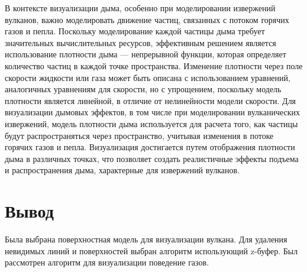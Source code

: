 В контексте визуализации дыма, особенно при моделировании извержений вулканов, важно моделировать движение частиц, связанных с потоком горячих газов и пепла. Поскольку моделирование каждой частицы дыма требует значительных вычислительных ресурсов, эффективным решением является использование плотности дыма --- непрерывной функции, которая определяет количество частиц в каждой точке пространства. Изменение плотности через поле скорости жидкости или газа может быть описана с использованием уравнений, аналогичных уравнениям для скорости, но с упрощением, поскольку модель плотности является линейной, в отличие от нелинейности модели скорости. Для визуализации дымовых эффектов, в том числе при моделировании вулканических извержений, модель плотности дыма используется для расчета того, как частицы будут распространяться через пространство, учитывая изменения в потоке горячих газов и пепла. Визуализация достигается путем отображения плотности дыма в различных точках, что позволяет создать реалистичные эффекты подъема и распространения дыма, характерные для извержений вулканов. 

\section*{Вывод}
Была выбрана поверхностная модель для визуализации вулкана. Для удаления невидимых линий и поверхностей выбран алгоритм использующий z-буфер. Был рассмотрен алгоритм для визуализации поведение газов.
